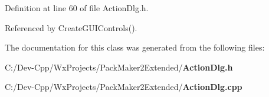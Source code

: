 Definition at line 60 of file Action\-Dlg.h.

Referenced by Create\-GUIControls().

The documentation for this class was generated from the following files:\begin{CompactItemize}
\item 
C:/Dev-Cpp/Wx\-Projects/Pack\-Maker2Extended/{\bf Action\-Dlg.h}\item 
C:/Dev-Cpp/Wx\-Projects/Pack\-Maker2Extended/{\bf Action\-Dlg.cpp}\end{CompactItemize}

